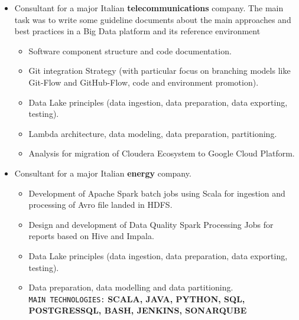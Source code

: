 \documentclass[9pt]{developercv} %
\begin{document}
\begin{entrylist}
{\begin{itemize}[noitemsep,topsep=0pt,parsep=0pt,partopsep=0pt, leftmargin=-1pt]
\begin{itemize}[noitemsep,topsep=0pt,parsep=0pt,partopsep=0pt]
                    {\texttt{\\MAIN TECHNOLOGIES:} \textbf{SCALA, PYTHON, BIG QUERY, COMPOSER, SQL, POSTGRESSQL, BIG TABLE, GCS, BASH, JENKINS, KAFKA, PUB SUB, AIRFLOW, SONARQUBE}}
                    \vspace{1mm}
                \end{itemize}
                \item {Consultant for a major Italian \textbf{telecommunications} company. The main task was to write some guideline documents about the main approaches and best practices in a Big Data platform and its reference environment}
                \begin{itemize}[noitemsep,topsep=0pt,parsep=0pt,partopsep=0pt]
                    \item {Software component structure and code documentation.}
                    \item {Git integration Strategy (with particular focus on branching models like Git-Flow and GitHub-Flow, code and
                    environment promotion).}
                    \item {Data Lake principles (data ingestion, data preparation, data exporting, testing).}
                    \item {Lambda architecture, data modeling, data preparation, partitioning.}
                    \item {Analysis for migration of Cloudera Ecosystem to Google Cloud Platform.} \vspace{1mm}
                \end{itemize}
                \item {Consultant for a major Italian \textbf{energy} company.}
                \begin{itemize}[noitemsep,topsep=0pt,parsep=0pt,partopsep=0pt]
                    \item {Development of Apache Spark batch jobs using Scala for ingestion and processing of Avro file landed in HDFS.}
                    \item {Design and development of Data Quality Spark Processing Jobs for reports based on Hive and Impala.}
                    \item {Data Lake principles (data ingestion, data preparation, data exporting, testing).}
                    \item {Data preparation, data modelling and data partitioning.}
                    {\texttt{\\MAIN TECHNOLOGIES:} \textbf{SCALA, JAVA, PYTHON, SQL, POSTGRESSQL, BASH, JENKINS, SONARQUBE}}\vspace{1mm}
                \end{itemize}
            \end{itemize}}
    \end{entrylist}
\end{document}
